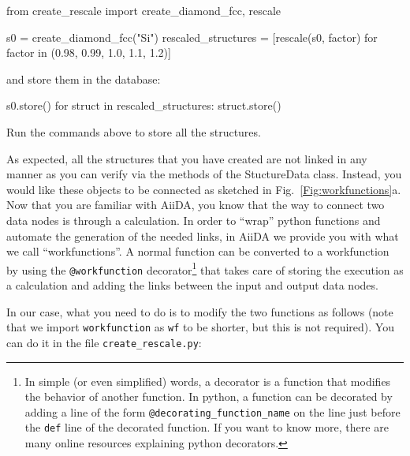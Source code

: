 \begin{pythoncommand}
from create_rescale import create_diamond_fcc, rescale

s0 = create_diamond_fcc("Si")
rescaled_structures = [rescale(s0, factor) for factor 
                      in (0.98, 0.99, 1.0, 1.1, 1.2)]
\end{pythoncommand}

and store them in the database:

\begin{pythoncommand}
s0.store()
for struct in rescaled_structures:
   struct.store()
\end{pythoncommand}

\begin{tcolorbox}
Run the commands above to store all the structures.
\end{tcolorbox}

As expected, all the structures that you have created are not linked in any manner as you can verify via the  methods of the StuctureData class.
Instead, you would like these objects to be connected as sketched in Fig.~\ref{Fig:workfunctions}a. Now that you are familiar with AiiDA, you know that the way to connect two data nodes is through a calculation.
In order to ``wrap'' python functions and automate the generation of the
needed links, in AiiDA we provide you with what we call ``workfunctions''. A normal function can be converted to a workfunction by using the \texttt{@workfunction} decorator\footnote{In simple (or even simplified) words, a decorator is a function that modifies the behavior of another function. In python, a function can be decorated by adding a line of the form \texttt{@decorating\_function\_name} on the line just before the \texttt{def} line of the decorated function. If you want to know more, there are many online resources explaining python decorators.} that takes care of storing the execution as a calculation and adding the links between the input and output data nodes.

\begin{tcolorbox}
In our case, what you need to do is to modify the two functions as follows (note that we import \texttt{workfunction} as \texttt{wf} to be shorter, but this is not required). You can do it in the file \texttt{create\_rescale.py}:
\end{tcolorbox}

